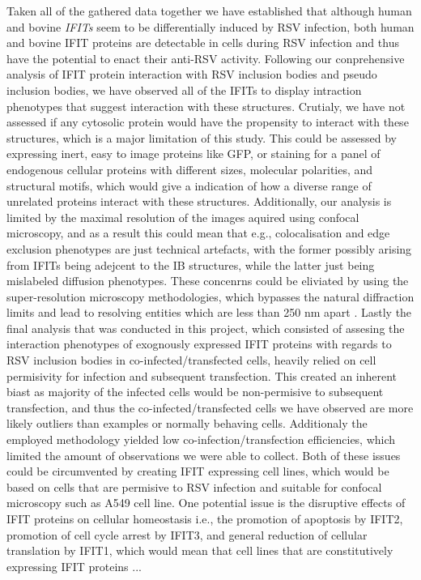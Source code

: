 Taken all of the gathered data together we have established that although human and bovine \textit{IFITs} seem to be differentially induced by RSV infection, both human and bovine IFIT proteins are detectable in cells during RSV infection and thus have the potential to enact their anti-RSV activity. Following our conprehensive analysis of IFIT protein interaction with RSV inclusion bodies and pseudo inclusion bodies, we have observed all of the IFITs to display intraction phenotypes that suggest interaction with these structures. Crutialy, we have not assessed if any cytosolic protein would have the propensity to interact with these structures, which is a major limitation of this study. This could be assessed by expressing inert, easy to image proteins like GFP, or staining for a panel of endogenous cellular proteins with different sizes, molecular polarities, and structural motifs, which would give a indication of how a diverse range of unrelated proteins interact with these structures. Additionally, our analysis is limited by the maximal resolution of the images aquired using confocal microscopy, and as a result this could mean that e.g., colocalisation and edge exclusion phenotypes are just technical artefacts, with the former possibly arising from IFITs being adejcent to the IB structures, while the latter just being mislabeled diffusion phenotypes. These concenrns could be eliviated by using the super-resolution microscopy methodologies, which bypasses the natural diffraction limits and lead to resolving entities which are less than 250 nm apart \cite{Schermelleh2019Super-resolutionDemystified}. Lastly the final analysis that was conducted in this project, which consisted of assesing the interaction phenotypes of exognously expressed IFIT proteins with regards to RSV inclusion bodies in co-infected/transfected cells, heavily relied on cell permisivity for infection and subsequent transfection. This created an inherent biast as majority of the infected cells would be non-permisive to subsequent transfection, and thus the co-infected/transfected cells we have observed are more likely outliers than examples or normally behaving cells. Additionaly the employed methodology yielded low co-infection/transfection efficiencies, which limited the amount of observations we were able to collect. Both of these issues could be circumvented by creating IFIT expressing cell lines, which would be based on cells that are permisive to RSV infection and suitable for confocal microscopy such as A549 cell line. One potential issue is the disruptive effects of IFIT proteins on cellular homeostasis i.e., the promotion of apoptosis by IFIT2, promotion of cell cycle arrest by IFIT3, and general reduction of cellular translation by IFIT1, which would mean that cell lines that are constitutively expressing IFIT proteins ...


